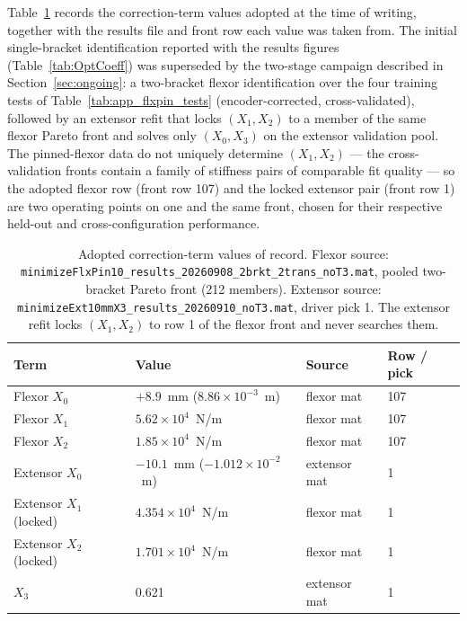 Table~\ref{tab:app_xi_values} records the correction-term values adopted at the time of writing, together with the results file and front row each value was taken from. The initial single-bracket identification reported with the results figures (Table~\ref{tab:OptCoeff}) was superseded by the two-stage campaign described in Section~\ref{sec:ongoing}: a two-bracket flexor identification over the four training tests of Table~\ref{tab:app_flxpin_tests} (encoder-corrected, cross-validated), followed by an extensor refit that locks $(X_{1}, X_{2})$ to a member of the same flexor Pareto front and solves only $(X_{0}, X_{3})$ on the extensor validation pool. The pinned-flexor data do not uniquely determine $(X_{1}, X_{2})$ --- the cross-validation fronts contain a family of stiffness pairs of comparable fit quality --- so the adopted flexor row (front row 107) and the locked extensor pair (front row 1) are two operating points on one and the same front, chosen for their respective held-out and cross-configuration performance.

\begin{table}[htbp]
\caption{Adopted correction-term values of record. Flexor source: \texttt{minimizeFlxPin10\_results\_20260908\_2brkt\_2trans\_noT3.mat}, pooled two-bracket Pareto front (212 members). Extensor source: \texttt{minimizeExt10mmX3\_results\_20260910\_noT3.mat}, driver pick 1. The extensor refit locks $(X_{1}, X_{2})$ to row 1 of the flexor front and never searches them.}
\label{tab:app_xi_values}
\begin{tabular}{@{}llll@{}}
\toprule
\textbf{Term} & \textbf{Value} & \textbf{Source} & \textbf{Row / pick} \\
\midrule
Flexor $X_{0}$   & $+8.9$~mm ($8.86\times10^{-3}$~m) & flexor mat & 107 \\
Flexor $X_{1}$   & $5.62\times10^{4}$~N/m           & flexor mat & 107 \\
Flexor $X_{2}$   & $1.85\times10^{4}$~N/m           & flexor mat & 107 \\
Extensor $X_{0}$ & $-10.1$~mm ($-1.012\times10^{-2}$~m) & extensor mat & 1 \\
Extensor $X_{1}$ (locked) & $4.354\times10^{4}$~N/m  & flexor mat & 1 \\
Extensor $X_{2}$ (locked) & $1.701\times10^{4}$~N/m  & flexor mat & 1 \\
$X_{3}$          & 0.621                            & extensor mat & 1 \\
\bottomrule
\end{tabular}
\end{table}

